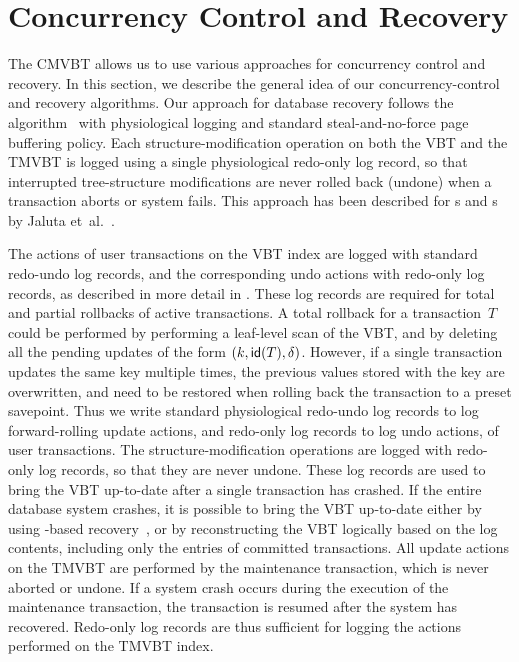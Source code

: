\section{Concurrency Control and Recovery}
\label{sec:cmvbt:concurrency}

The CMVBT allows us to use various approaches for concurrency control and
recovery. 
In this section, we describe the general idea of our concurrency-control and
recovery algorithms.
Our approach for database recovery follows the 
algorithm~\cite{mohan:1992:aries,mohan:1992:aries-im,mohan:1990:aries-kvl}
with physiological logging and standard steal-and-no-force page buffering
policy.
Each structure-modification operation on both the VBT and the
TMVBT is logged using a single physiological redo-only log
record, so that interrupted tree-structure modifications are never
rolled back (undone) when a transaction aborts or system fails.
This approach has been described for \Btree{}s and \Blinktree{}s by Jaluta
et~al.~\cite{jaluta:2005:blink,jaluta:2006:page-server}.

The actions of user transactions on the VBT index are logged with
standard redo-undo log records, and the corresponding undo actions with  
redo-only log records, as described in more detail in
. 
These log records are required for total and partial rollbacks of active
transactions.
A total rollback for a transaction~$T$ could be performed by performing a
leaf-level scan of the VBT, and by deleting all the pending updates of the
form $(k, \text{\textsf{id}}(T), \delta)$.
However, if a single transaction updates the same key multiple times,
the previous values stored with the key are overwritten, and need to
be restored when rolling back the transaction to a preset savepoint. 
Thus we write standard physiological redo-undo log records to log
forward-rolling update actions, and redo-only log records to log undo
actions, of user transactions.
The structure-modification operations are logged with redo-only log
records, so that they are never undone.
These log records are used to bring the VBT up-to-date after a single
transaction has crashed.
If the entire database system crashes, it is possible to bring the VBT
up-to-date either by using -based
recovery~\cite{mohan:1992:aries,mohan:1992:aries-im}, or by reconstructing
the VBT logically based on the log contents, including only the entries of
committed transactions.
All update actions on the TMVBT are performed by the maintenance transaction,
which is never aborted or undone. 
If a system crash occurs during the execution of the maintenance transaction,
the transaction is resumed after the system has recovered. 
Redo-only log records are thus sufficient for logging the actions
performed on the TMVBT index.


